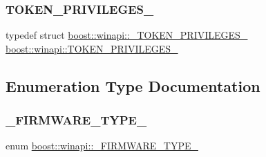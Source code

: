 \subsubsection{\texorpdfstring{T\+O\+K\+E\+N\+\_\+\+P\+R\+I\+V\+I\+L\+E\+G\+E\+S\+\_\+}{TOKEN\_PRIVILEGES\_}}
{\footnotesize\ttfamily typedef struct \mbox{\hyperlink{structboost_1_1winapi_1_1___t_o_k_e_n___p_r_i_v_i_l_e_g_e_s__}{boost\+::winapi\+::\+\_\+\+T\+O\+K\+E\+N\+\_\+\+P\+R\+I\+V\+I\+L\+E\+G\+E\+S\+\_\+}}  \mbox{\hyperlink{namespaceboost_1_1winapi_a2f67ef0e5761d692b8782a76d1d9d5da}{boost\+::winapi\+::\+T\+O\+K\+E\+N\+\_\+\+P\+R\+I\+V\+I\+L\+E\+G\+E\+S\+\_\+}}}



\subsection{Enumeration Type Documentation}
\mbox{\label{namespaceboost_1_1winapi_a95c858e6ecc52cd337e0e5e8ef33841d}} 
\subsubsection{\texorpdfstring{\+\_\+\+F\+I\+R\+M\+W\+A\+R\+E\+\_\+\+T\+Y\+P\+E\+\_\+}{\_FIRMWARE\_TYPE\_}}
{\footnotesize\ttfamily enum \mbox{\hyperlink{namespaceboost_1_1winapi_a95c858e6ecc52cd337e0e5e8ef33841d}{boost\+::winapi\+::\+\_\+\+F\+I\+R\+M\+W\+A\+R\+E\+\_\+\+T\+Y\+P\+E\+\_\+}}}

